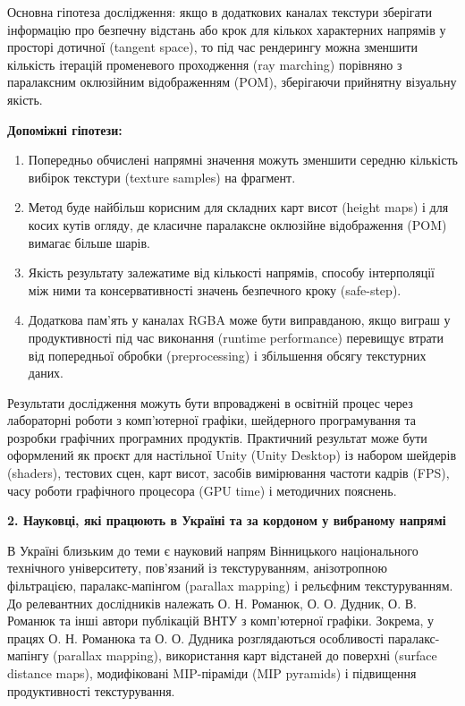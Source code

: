\documentclass[14pt,a4paper]{extarticle}
\newcommand{\eng}[1]{\foreignlanguage{english}{#1}}
\newcommand{\sectiontitle}[1]{%
  \par\vspace{\baselineskip}%
  \noindent\textbf{#1}\par
}
\begin{document}
Основна гіпотеза дослідження: якщо в додаткових каналах текстури зберігати інформацію про безпечну відстань або крок для кількох характерних напрямів у просторі дотичної (\eng{tangent space}), то під час рендерингу можна зменшити кількість ітерацій променевого проходження (\eng{ray marching}) порівняно з паралаксним оклюзійним відображенням (POM), зберігаючи прийнятну візуальну якість.

\noindent\textbf{Допоміжні гіпотези:}
\begin{enumerate}
  \item Попередньо обчислені напрямні значення можуть зменшити середню кількість вибірок текстури (\eng{texture samples}) на фрагмент.
  \item Метод буде найбільш корисним для складних карт висот (\eng{height maps}) і для косих кутів огляду, де класичне паралаксне оклюзійне відображення (POM) вимагає більше шарів.
  \item Якість результату залежатиме від кількості напрямів, способу інтерполяції між ними та консервативності значень безпечного кроку (\eng{safe-step}).
  \item Додаткова пам'ять у каналах RGBA може бути виправданою, якщо виграш у продуктивності під час виконання (\eng{runtime performance}) перевищує втрати від попередньої обробки (\eng{preprocessing}) і збільшення обсягу текстурних даних.
\end{enumerate}

Результати дослідження можуть бути впроваджені в освітній процес через лабораторні роботи з комп'ютерної графіки, шейдерного програмування та розробки графічних програмних продуктів. Практичний результат може бути оформлений як проєкт для настільної Unity (\eng{Unity Desktop}) із набором шейдерів (\eng{shaders}), тестових сцен, карт висот, засобів вимірювання частоти кадрів (FPS), часу роботи графічного процесора (\eng{GPU time}) і методичних пояснень.

\sectiontitle{2. Науковці, які працюють в Україні та за кордоном у вибраному напрямі}

В Україні близьким до теми є науковий напрям Вінницького національного технічного університету, пов'язаний із текстуруванням, анізотропною фільтрацією, паралакс-мапінгом (\eng{parallax mapping}) і рельєфним текстуруванням. До релевантних дослідників належать О. Н. Романюк, О. О. Дудник, О. В. Романюк та інші автори публікацій ВНТУ з комп'ютерної графіки. Зокрема, у працях О. Н. Романюка та О. О. Дудника розглядаються особливості паралакс-мапінгу (\eng{parallax mapping}), використання карт відстаней до поверхні (\eng{surface distance maps}), модифіковані MIP-піраміди (\eng{MIP pyramids}) і підвищення продуктивності текстурування.
\end{document}
